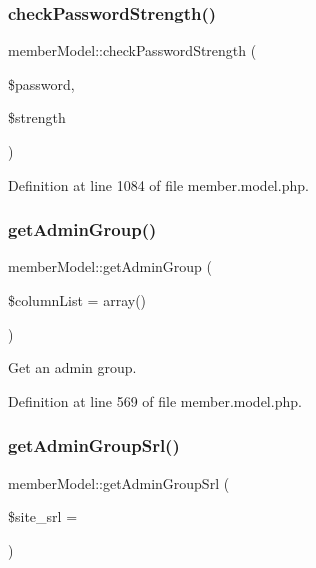 \subsubsection{\texorpdfstring{check\+Password\+Strength()}{checkPasswordStrength()}}
{\footnotesize\ttfamily member\+Model\+::check\+Password\+Strength (\begin{DoxyParamCaption}\item[{}]{\$password,  }\item[{}]{\$strength }\end{DoxyParamCaption})}



Definition at line 1084 of file member.\+model.\+php.

\hypertarget{classmemberModel_a76c700571e22b4dd519c7b34e0c3a636}{}\label{classmemberModel_a76c700571e22b4dd519c7b34e0c3a636} 
\subsubsection{\texorpdfstring{get\+Admin\+Group()}{getAdminGroup()}}
{\footnotesize\ttfamily member\+Model\+::get\+Admin\+Group (\begin{DoxyParamCaption}\item[{}]{\$column\+List = {\ttfamily array()} }\end{DoxyParamCaption})}



Get an admin group. 



Definition at line 569 of file member.\+model.\+php.

\hypertarget{classmemberModel_ad8c1aafe9a4f461404b596ff6ad3e2ed}{}\label{classmemberModel_ad8c1aafe9a4f461404b596ff6ad3e2ed} 
\subsubsection{\texorpdfstring{get\+Admin\+Group\+Srl()}{getAdminGroupSrl()}}
{\footnotesize\ttfamily member\+Model\+::get\+Admin\+Group\+Srl (\begin{DoxyParamCaption}\item[{}]{\$site\+\_\+srl = {} }\end{DoxyParamCaption})}




